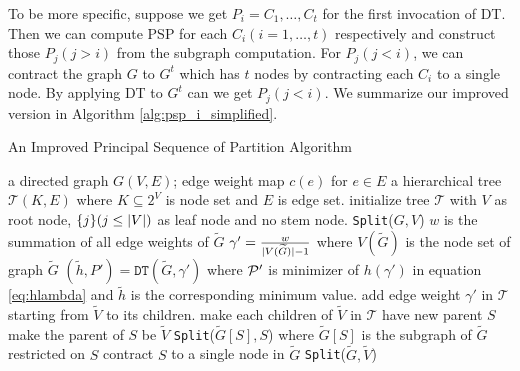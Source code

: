 \documentclass[runningheads]{llncs}
\begin{document}
To be more specific, suppose we get $P_i = {C_1, \dots, C_t}$ for the first invocation of DT. Then we can compute PSP for each $C_i(i=1,\dots, t)$ respectively and construct those $P_j(j>i)$ from the subgraph computation. For $P_j(j<i)$, we can contract the graph $G$  to $G^t$ which has $t$ nodes by contracting each $C_i$ to a single node. By applying DT to $G^t$ can we get $P_j(j<i)$. We summarize our improved version in Algorithm \ref{alg:psp_i_simplified}.

\begin{algorithm}
	\caption{An Improved Principal Sequence of Partition Algorithm}\label{alg:psp_i_simplified}
	\begin{algorithmic}[1]
		\REQUIRE a directed graph $G(V, E)$; edge weight map $c(e)$ for $e\in E$
		\ENSURE a hierarchical tree $\mathcal{T}(K, E)$ where $K \subseteq 2^{V}$ is node set and $E$ is edge set.
		\STATE initialize tree $\mathcal{T}$ with $V$ as root node, $\{j\}(j\leq \abs{V})$ as leaf node and no stem node.
		\STATE \texttt{Split}($G, V$)
		\STATE $w$ is the summation of all edge weights of $\widetilde{G}$ 
		\STATE $\gamma' = \frac{w}{\abs{V(\widetilde{G})}-1}$ where $V(\widetilde{G})$ is the node set of graph $\widetilde{G}$ \label{alg:gamma_apostrophe}
		\STATE $(\tilde{h}, P') = \texttt{DT}(\widetilde{G}, \gamma')$ where $\P'$ is minimizer of $h(\gamma')$ in equation \eqref{eq:hlambda} and $\tilde{h}$ is the corresponding minimum value.  \label{alg:DT}
		\STATE add edge weight $\gamma'$ in $\mathcal{T}$ starting from $\widetilde{V}$ to its children.
		\ELSE
		\STATE make each children of $\widetilde{V}$ in $\mathcal{T}$ have new parent $S$		
		\STATE make the parent of $S$ be $\widetilde{V}$
		\STATE \texttt{Split}($\widetilde{G}[S], S$) where $\widetilde{G}[S]$ is the subgraph of $\widetilde{G}$ restricted on $S$
		\STATE contract $S$ to a single node in $\widetilde{G}$ %
		\ENDFOR 
		\STATE \texttt{Split}($\widetilde{G}, \widetilde{V}$)		
		\ENDIF
		\ENDFUNCTION
	\end{algorithmic}
\end{algorithm}
	
	
	
\end{document}
